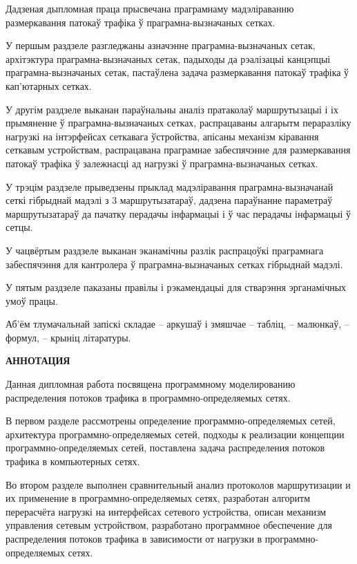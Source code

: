 
Дадзеная дыпломная праца прысвечана праграмнаму мадэліраванню
размеркавання патокаў трафіка ў праграмна-вызначаных сетках.

У першым раздзеле разгледжаны азначэнне праграмна-вызначаных сетак,
архітэктура праграмна-вызначаных сетак, падыходы да рэалізацыі
канцэпцыі праграмна-вызначаных сетак, пастаўлена задача
размеркавання патокаў трафіка ў кап'ютарных сетках.

У другім раздзеле выканан параўнальны аналіз пратаколаў маршрутызацыі
і іх прымяненне ў праграмна-вызначаных сетках, распрацаваны алгарытм
пераразліку нагрузкі на інтэрфейсах сеткавага ўстройства,
апісаны механізм кіравання сеткавым устройствам, распрацавана
праграмнае забеспячэнне для размеркавання патокаў трафіка ў
залежнасці ад нагрузкі ў праграмна-вызначаных сетках.

У трэцім раздзеле прыведзены прыклад мадэліравання праграмна-вызначанай
сеткі гібрыднай мадэлі з 3 маршрутызатараў, дадзена параўнанне параметраў
маршрутызатараў да пачатку перадачы інфармацыі і ў час перадачы інфармацыі
ў сетцы.

У чацвёртым раздзеле выканан эканамічны разлік распрацоўкі праграмнага
забеспячэння для кантролера ў праграмна-вызначаных сетках гібрыднай мадэлі.

У пятым раздзеле паказаны правілы і рэкамендацыі для стварэння
эрганамічных умоў працы.

Аб'ём тлумачальнай запіскі складае -- аркушаў і змяшчае
-- табліц, -- малюнкаў, -- формул, -- крыніц літаратуры.

\clearpage

\begin{center}
\fontsize{14}{14}
\selectfont
\textbf{АННОТАЦИЯ}
\end{center}

Данная дипломная работа посвящена программному моделированию
распределения потоков трафика в программно-определяемых сетях.

В первом разделе рассмотрены определение программно-определяемых
сетей, архитектура программно-определяемых сетей, подходы к реализации
концепции программно-оп\-ре\-де\-ля\-емых сетей, поставлена задача распределения
потоков трафика в компьютерных сетях.

Во втором разделе выполнен сравнительный анализ протоколов маршрутизации
и их применение в программно-определяемых сетях, разработан алгоритм
перерасчёта нагрузкі на интерфейсах сетевого устройства, описан механизм
управления сетевым устройством, разработано программное обеспечение для
распределения потоков трафика в зависимости от нагрузки в программно-определяемых сетях.

